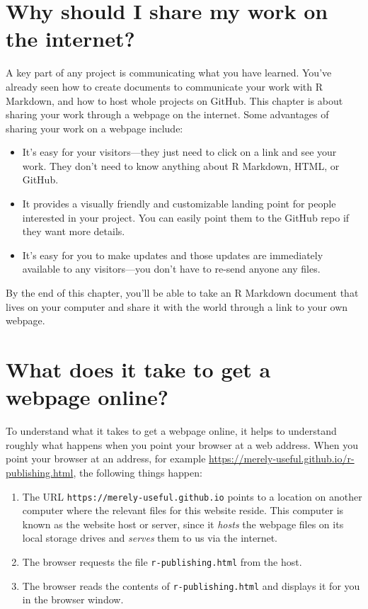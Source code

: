 \documentclass[]{Nemilov}
\providecommand{\tightlist}{%
  \setlength{\itemsep}{0pt}\setlength{\parskip}{0pt}}
\begin{document}
\hypertarget{why-should-i-share-my-work-on-the-internet}{%
\section{Why should I share my work on the internet?}\label{why-should-i-share-my-work-on-the-internet}}

A key part of any project is communicating what you have learned. You've already seen how to create documents to communicate your work with R Markdown, and how to host whole projects on GitHub. This chapter is about sharing your work through a webpage on the internet. Some advantages of sharing your work on a webpage include:

\begin{itemize}
\tightlist
\item
  It's easy for your visitors---they just need to click on a link and see your work. They don't need to know anything about R Markdown, HTML, or GitHub.
\item
  It provides a visually friendly and customizable landing point for people interested in your project. You can easily point them to the GitHub repo if they want more details.
\item
  It's easy for you to make updates and those updates are immediately available to any visitors---you don't have to re-send anyone any files.
\end{itemize}

By the end of this chapter, you'll be able to take an R Markdown document that lives on your computer and share it with the world through a link to your own webpage.

\hypertarget{what-does-it-take-to-get-a-webpage-online}{%
\section{What does it take to get a webpage online?}\label{what-does-it-take-to-get-a-webpage-online}}

To understand what it takes to get a webpage online, it helps to understand roughly what happens when you point your browser at a web address. When you point your browser at an address, for example \url{https://merely-useful.github.io/r-publishing.html}, the following things happen:

\begin{enumerate}
\def\labelenumi{\arabic{enumi}.}
\tightlist
\item
  The URL \texttt{https://merely-useful.github.io} points to a location on another computer where the relevant files for this website reside. This computer is known as the website host or server, since it \emph{hosts} the webpage files on its local storage drives and \emph{serves} them to us via the internet.
\item
  The browser requests the file \texttt{r-publishing.html} from the host.
\item
  The browser reads the contents of \texttt{r-publishing.html} and displays it for you in the browser window.
\end{enumerate}
\end{document}

